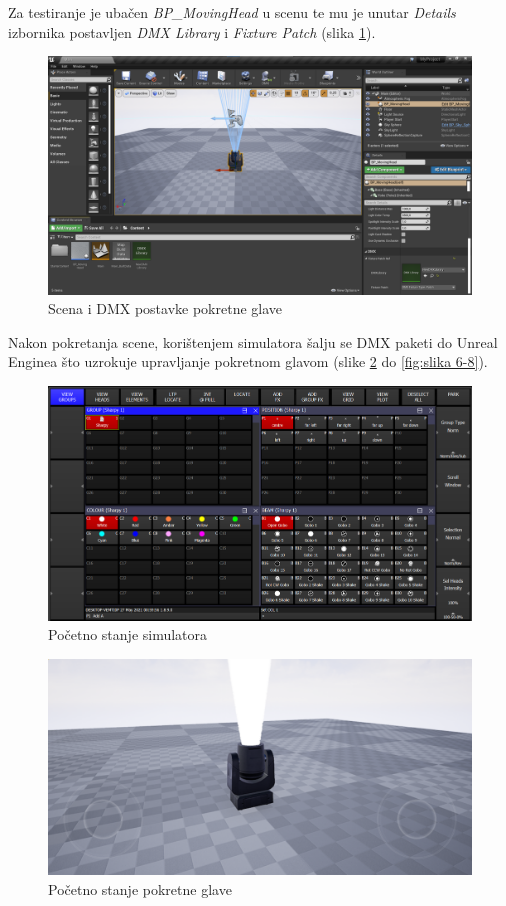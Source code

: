 \documentclass[times, utf8, zavrsni, numeric]{fer}
\begin{document}
Za testiranje je ubačen \emph{BP\_MovingHead} u scenu te mu je unutar \emph{Details} izbornika postavljen \emph{DMX Library} i \emph{Fixture Patch} (slika \ref{fig:slika 6-4}).

\begin{figure}[htp]
	\centering
	\includegraphics[width=\linewidth]{slika 6-4.png}
	\caption{Scena i DMX postavke pokretne glave}
	\label{fig:slika 6-4}
\end{figure}

Nakon pokretanja scene, korištenjem simulatora šalju se DMX paketi do Unreal Enginea što uzrokuje upravljanje pokretnom glavom (slike \ref{fig:slika 6-5} do \ref{fig:slika 6-8}).

\begin{figure}[htp]
	\centering
	\includegraphics[width=\linewidth]{slika 6-5.png}
	\caption{Početno stanje simulatora}
	\label{fig:slika 6-5}
\end{figure}

\begin{figure}[htp]
	\centering
	\includegraphics[width=\linewidth]{slika 6-6.png}
	\caption{Početno stanje pokretne glave}
	\label{fig:slika 6-6}
\end{figure}
\end{document}
